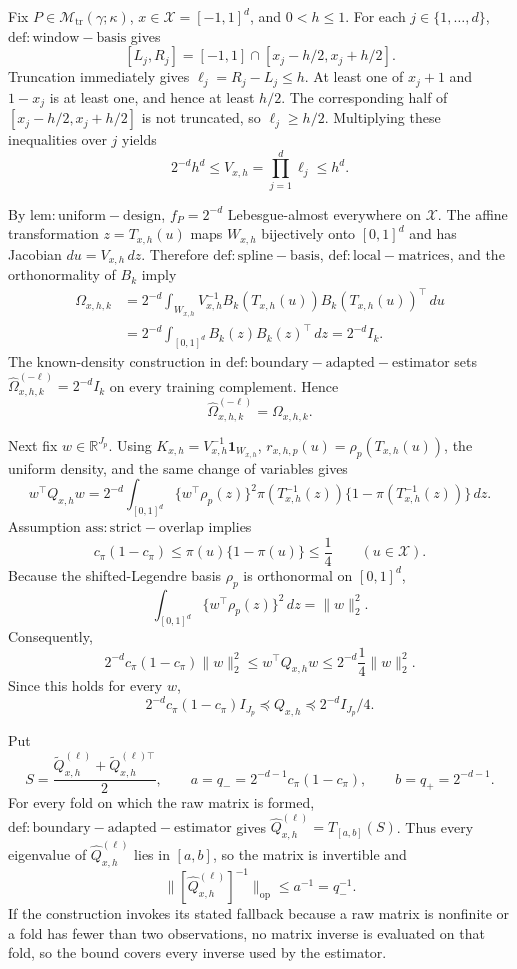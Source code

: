 Fix \(P\in\mathcal M_{\mathrm{tr}}(\gamma;\kappa)\), \(x\in\mathcal X=[-1,1]^d\), and \(0<h\le1\). For each \(j\in\{1,\ldots,d\}\), \(\mathrm{def:window-basis}\) gives
\[
 [L_j,R_j]=[-1,1]\cap[x_j-h/2,x_j+h/2].
\]
Truncation immediately gives \(\ell_j=R_j-L_j\le h\). At least one of \(x_j+1\) and \(1-x_j\) is at least one, and hence at least \(h/2\). The corresponding half of \([x_j-h/2,x_j+h/2]\) is not truncated, so \(\ell_j\ge h/2\). Multiplying these inequalities over \(j\) yields
\[
 2^{-d}h^d\le V_{x,h}=\prod_{j=1}^d\ell_j\le h^d.
\]

By \(\mathrm{lem:uniform-design}\), \(f_P=2^{-d}\) Lebesgue-almost everywhere on \(\mathcal X\). The affine transformation \(z=T_{x,h}(u)\) maps \(W_{x,h}\) bijectively onto \([0,1]^d\) and has Jacobian \(du=V_{x,h}\,dz\). Therefore \(\mathrm{def:spline-basis}\), \(\mathrm{def:local-matrices}\), and the orthonormality of \(B_k\) imply
\[
\begin{aligned}
 \Omega_{x,h,k}
 &=2^{-d}\int_{W_{x,h}}V_{x,h}^{-1}B_k(T_{x,h}(u))B_k(T_{x,h}(u))^\top\,du\\
 &=2^{-d}\int_{[0,1]^d}B_k(z)B_k(z)^\top\,dz
 =2^{-d}I_k.
\end{aligned}
\]
The known-density construction in \(\mathrm{def:boundary-adapted-estimator}\) sets \(\widehat\Omega^{(-\ell)}_{x,h,k}=2^{-d}I_k\) on every training complement. Hence
\[
 \widehat\Omega^{(-\ell)}_{x,h,k}=\Omega_{x,h,k}.
\]

Next fix \(w\in\mathbb R^{J_p}\). Using \(K_{x,h}=V_{x,h}^{-1}\mathbf 1_{W_{x,h}}\), \(r_{x,h,p}(u)=\rho_p(T_{x,h}(u))\), the uniform density, and the same change of variables gives
\[
 w^\top Q_{x,h}w
 =2^{-d}\int_{[0,1]^d}\{w^\top\rho_p(z)\}^2
 \pi(T_{x,h}^{-1}(z))\{1-\pi(T_{x,h}^{-1}(z))\}\,dz.
\]
Assumption \(\mathrm{ass:strict-overlap}\) implies
\[
 c_\pi(1-c_\pi)\le\pi(u)\{1-\pi(u)\}\le\frac14
 \qquad(u\in\mathcal X).
\]
Because the shifted-Legendre basis \(\rho_p\) is orthonormal on \([0,1]^d\),
\[
 \int_{[0,1]^d}\{w^\top\rho_p(z)\}^2\,dz=\lVert w\rVert_2^2.
\]
Consequently,
\[
 2^{-d}c_\pi(1-c_\pi)\lVert w\rVert_2^2
 \le w^\top Q_{x,h}w
 \le 2^{-d}\frac14\lVert w\rVert_2^2.
\]
Since this holds for every \(w\),
\[
 2^{-d}c_\pi(1-c_\pi)I_{J_p}
 \preceq Q_{x,h}
 \preceq 2^{-d}I_{J_p}/4.
\]

Put
\[
 S=\frac{\widetilde Q^{(\ell)}_{x,h}+\widetilde Q^{(\ell)\top}_{x,h}}2,
 \qquad a=q_-=2^{-d-1}c_\pi(1-c_\pi),
 \qquad b=q_+=2^{-d-1}.
\]
For every fold on which the raw matrix is formed, \(\mathrm{def:boundary-adapted-estimator}\) gives \(\widehat Q^{(\ell)}_{x,h}=T_{[a,b]}(S)\). Thus every eigenvalue of \(\widehat Q^{(\ell)}_{x,h}\) lies in \([a,b]\), so the matrix is invertible and
\[
 \bigl\lVert[\widehat Q^{(\ell)}_{x,h}]^{-1}\bigr\rVert_{\mathrm{op}}
 \le a^{-1}=q_-^{-1}.
\]
If the construction invokes its stated fallback because a raw matrix is nonfinite or a fold has fewer than two observations, no matrix inverse is evaluated on that fold, so the bound covers every inverse used by the estimator.

